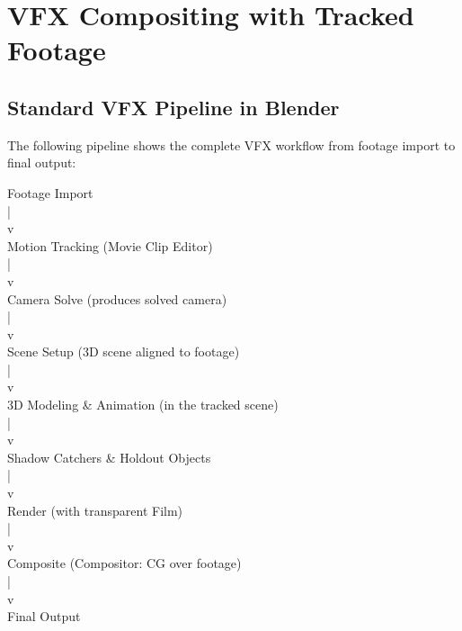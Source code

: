 \section{VFX Compositing with Tracked Footage}
\label{sec:vfx-compositing}

\subsection{Standard VFX Pipeline in Blender}

The following pipeline shows the complete VFX workflow from footage import to final output:

\begin{codebox}
Footage Import\\
\hspace*{1em}|\\
\hspace*{1em}v\\
Motion Tracking (Movie Clip Editor)\\
\hspace*{1em}|\\
\hspace*{1em}v\\
Camera Solve (produces solved camera)\\
\hspace*{1em}|\\
\hspace*{1em}v\\
Scene Setup (3D scene aligned to footage)\\
\hspace*{1em}|\\
\hspace*{1em}v\\
3D Modeling \& Animation (in the tracked scene)\\
\hspace*{1em}|\\
\hspace*{1em}v\\
Shadow Catchers \& Holdout Objects\\
\hspace*{1em}|\\
\hspace*{1em}v\\
Render (with transparent Film)\\
\hspace*{1em}|\\
\hspace*{1em}v\\
Composite (Compositor: CG over footage)\\
\hspace*{1em}|\\
\hspace*{1em}v\\
Final Output
\end{codebox}

